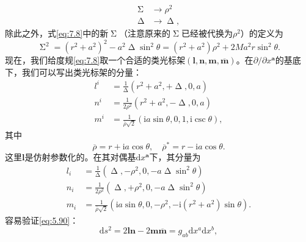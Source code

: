 \begin{equation*}
	\begin{aligned}
		\upSigma  & \rightarrow \rho ^{2}\\
		\upDelta  & \rightarrow \upDelta ,
	\end{aligned}
\end{equation*}
除此之外，式\ref{eq:7.8}中的新$\upSigma $（注意原来的$\upSigma $已经被代换为$\rho ^{2}$）的定义为
\begin{equation*}
	\upSigma ^{2} =(r^{2} +a^{2} )^{2} -a^{2} \upDelta \sin^{2} \theta =(r^{2} +a^{2} )\rho ^{2} +2Ma^{2} r\sin^{2} \theta .
\end{equation*}
现在，我们给度规\ref{eq:7.8}取一个合适的类光标架$(\boldsymbol{l} ,\boldsymbol{n} ,\boldsymbol{m} ,\overline{\boldsymbol{m}})$。在$\partial /\partial x^{\boldsymbol{a}}$的基底下，我们可以写出类光标架的分量：
\begin{equation}
	\begin{aligned}
		l^{i} & =\frac{1}{\upDelta } (r^{2} +a^{2} ,+\upDelta ,0,a)\\
		n^{i} & =\frac{1}{2\rho ^{2}} (r^{2} +a^{2} ,-\upDelta ,0,a)\\
		m^{i} & =\frac{1}{\overline{\rho }\sqrt{2}} (\mathrm{i} a\sin \theta ,0,1,\mathrm{i}\csc \theta ),
	\end{aligned}
	\label{eq:7.9}
\end{equation}
其中
\begin{equation*}
	\overline{\rho } =r+\mathrm{i} a\cos \theta ,\quad \overline{\rho }^{*} =r-\mathrm{i} a\cos \theta .
\end{equation*}
这里$\boldsymbol{l}$是仿射参数化的。在其对偶基$\mathrm{d} x^{\boldsymbol{a}}$下，其分量为
\begin{equation*}
	\begin{aligned}
		l_{i} & =\frac{1}{\upDelta } (\upDelta ,-\rho ^{2} ,0,-a\upDelta \sin^{2} \theta )\\
		n_{i} & =\frac{1}{2\rho ^{2}} (\upDelta ,+\rho ^{2} ,0,-a\upDelta \sin^{2} \theta )\\
		m_{i} & =\frac{1}{\overline{\rho }\sqrt{2}} (\mathrm{i} a\sin \theta ,0,-\rho ^{2} ,-\mathrm{i} (r^{2} +a^{2} )\sin \theta ).
	\end{aligned}
\end{equation*}
容易验证\ref{eq:5.90}：
\begin{equation*}
	\mathrm{d} s^{2} =2\boldsymbol{ln} -2\boldsymbol{m}\overline{\boldsymbol{m}} =g_{ab}\mathrm{d} x^{a}\mathrm{d} x^{b} ,
\end{equation*}
